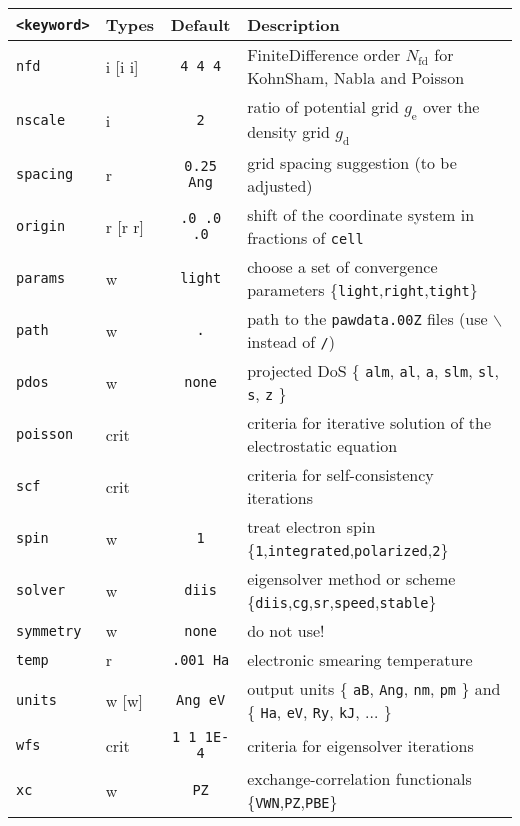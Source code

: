 \documentclass[12pt,BCOR8mm,noappendixprefix,nochapterprefix,bibtotoc,idxtotoc,openbib,tablecaptionabove]{scrbook}
\newcommand{\um}[1]{_{\mathrm{#1}} }
\newcommand{\ttt}[1]{\texttt{#1}}
\begin{document}
\begin{sidewaystable}
\begin{tabular}{ l lcl }
\hline
 \ttt{<keyword>} & Types & Default & Description \\
\hline
 \ttt{nfd     } & i [i i] & \ttt{4 4 4} & FiniteDifference order $N\um{fd}$ for KohnSham, Nabla and Poisson \\
 \ttt{nscale  } & i & \ttt{2} & ratio of potential grid $g\um e$ over the density grid $g\um d$ \\
 \ttt{spacing } & r & \ttt{0.25 Ang} & grid spacing suggestion (to be adjusted) \\
 \ttt{origin  } & r [r r] & \ttt{.0 .0 .0} & shift of the coordinate system in fractions of \ttt{cell} \\
 \ttt{params  } & w & \ttt{light} & choose a set of convergence parameters \{\ttt{light},\ttt{right},\ttt{tight}\} \\
 \ttt{path    } & w & \ttt{.} & path to the \ttt{pawdata.00Z} files (use $\backslash$ instead of \ttt{/}) \\
 \ttt{pdos    } & w & \ttt{none} & projected DoS \{ \ttt{alm}, \ttt{al}, \ttt{a}, \ttt{slm}, \ttt{sl}, \ttt{s}, \ttt{z} \} \\
 \ttt{poisson } & crit & & criteria for iterative solution of the electrostatic equation \\
 \ttt{scf     } & crit & & criteria for self-consistency iterations \\
 \ttt{spin    } & w & \ttt{1} & treat electron spin \{\ttt{1},\ttt{integrated},\ttt{polarized},\ttt{2}\} \\
 \ttt{solver  } & w & \ttt{diis} & eigensolver method or scheme \{\ttt{diis},\ttt{cg},\ttt{sr},\ttt{speed},\ttt{stable}\} \\
 \ttt{symmetry} & w & \ttt{none} & do not use! \\
 \ttt{temp    } & r & \ttt{.001 Ha} & electronic smearing temperature \\
 \ttt{units   } & w [w] & \ttt{Ang eV} & output units \{ \ttt{aB}, \ttt{Ang}, \ttt{nm}, \ttt{pm} \} and \{ \ttt{Ha}, \ttt{eV}, \ttt{Ry}, \ttt{kJ}, $\dots$ \} \\
 \ttt{wfs     } & crit & \ttt{1 1 1E-4} & criteria for eigensolver iterations \\
 \ttt{xc      } & w & \ttt{PZ} & exchange-correlation functionals \{\ttt{VWN},\ttt{PZ},\ttt{PBE}\} \\
\hline
\end{tabular}


\end{sidewaystable}
\end{document}
